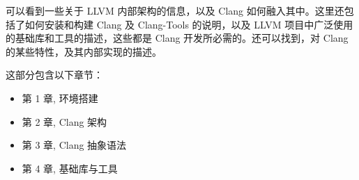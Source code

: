 

可以看到一些关于 LLVM 内部架构的信息，以及 Clang 如何融入其中。这里还包括了如何安装和构建 Clang 及 Clang-Tools 的说明，以及 LLVM 项目中广泛使用的基础库和工具的描述，这些都是 Clang 开发所必需的。还可以找到，对 Clang 的某些特性，及其内部实现的描述。

这部分包含以下章节：

\begin{itemize}
\item
第 1 章, 环境搭建

\item
第 2 章, Clang 架构

\item
第 3 章, Clang 抽象语法

\item
第 4 章, 基础库与工具
\end{itemize}
